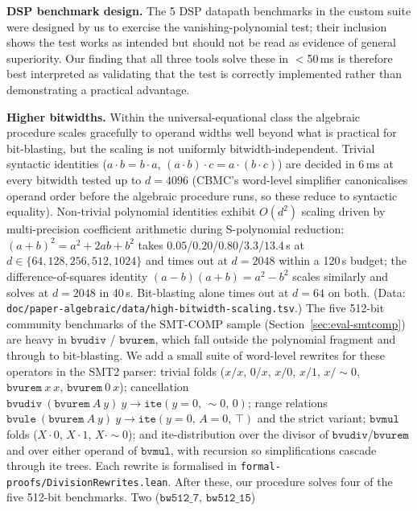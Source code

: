\documentclass[runningheads]{llncs}
\begin{document}
\textbf{DSP benchmark design.} The 5 DSP datapath benchmarks in
the custom suite were designed by us to exercise the
vanishing-polynomial test; their inclusion shows the test works
as intended but should not be read as evidence of general
superiority. Our finding that all three tools solve these in
$<$50\,ms is therefore best interpreted as validating that the
test is correctly implemented rather than demonstrating a practical
advantage.

\textbf{Higher bitwidths.} Within the universal-equational class
the algebraic procedure scales gracefully to operand widths well
beyond what is practical for bit-blasting, but the scaling is
not uniformly bitwidth-independent. Trivial syntactic identities
($a \cdot b = b \cdot a$, $(a \cdot b) \cdot c = a \cdot (b \cdot c)$)
are decided in 6\,ms at every bitwidth tested up to
$d = 4096$ (CBMC's word-level simplifier canonicalises operand
order before the algebraic procedure runs, so these reduce to
syntactic equality). Non-trivial polynomial identities exhibit
$O(d^2)$ scaling driven by multi-precision coefficient
arithmetic during S-polynomial reduction:
$(a+b)^2 = a^2 + 2ab + b^2$ takes
$0.05$/$0.20$/$0.80$/$3.3$/$13.4$\,s at
$d \in \{64, 128, 256, 512, 1024\}$ and times out at
$d = 2048$ within a 120\,s budget; the difference-of-squares
identity $(a-b)(a+b) = a^2 - b^2$ scales similarly and solves
at $d = 2048$ in 40\,s. Bit-blasting alone times out at
$d = 64$ on both. (Data:
\texttt{doc/paper-algebraic/data/high-bitwidth-scaling.tsv}.)
The five 512-bit community benchmarks of the SMT-COMP sample
(Section~\ref{sec:eval-smtcomp}) are heavy in
$\mathtt{bvudiv}$ / $\mathtt{bvurem}$, which fall outside the
polynomial fragment and through to bit-blasting. We add a small
suite of word-level rewrites for these operators in the SMT2
parser: trivial folds ($x/x$, $0/x$, $x/0$, $x/1$, $x/{\sim}0$,
$\mathtt{bvurem}\ x\ x$, $\mathtt{bvurem}\ 0\ x$); cancellation
$\mathtt{bvudiv}\ (\mathtt{bvurem}\ A\ y)\ y \to
\mathtt{ite}(y = 0,\, {\sim}0,\, 0)$; range relations
$\mathtt{bvule}\ (\mathtt{bvurem}\ A\ y)\ y \to
\mathtt{ite}(y = 0,\, A = 0,\, \top)$ and the strict variant;
$\mathtt{bvmul}$ folds ($X \cdot 0$, $X \cdot 1$,
$X \cdot {\sim}0$); and ite-distribution over the divisor of
$\mathtt{bvudiv}$/$\mathtt{bvurem}$ and over either operand of
$\mathtt{bvmul}$, with recursion so simplifications cascade
through ite trees. Each rewrite is formalised in
\texttt{formal-proofs/DivisionRewrites.lean}.
After these, our procedure solves four of the five 512-bit
benchmarks. Two ($\mathtt{bw512\_7}$, $\mathtt{bw512\_15}$)
\end{document}
